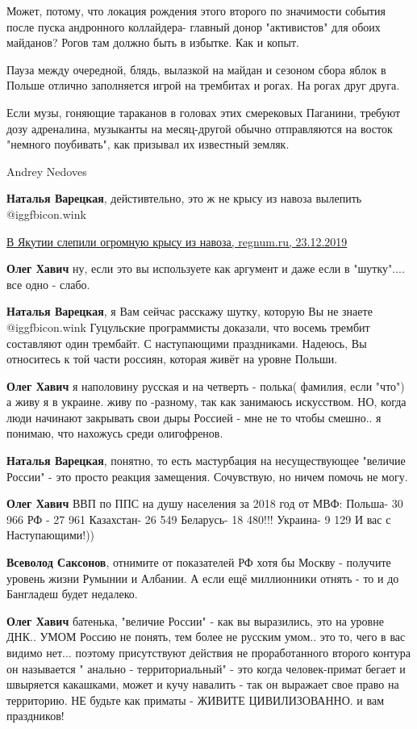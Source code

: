 \begin{itemize}
\begin{itemize}
Может, потому, что локация рождения этого второго по значимости события после
пуска андронного коллайдера- главный донор "активистов" для обоих майданов?
Рогов там должно быть в избытке. Как и копыт.

Пауза между очередной, блядь, вылазкой на майдан и сезоном сбора яблок в Польше
отлично заполняется игрой на трембитах и рогах. На рогах друг друга.

Если музы, гоняющие тараканов в головах этих смерековых Паганини, требуют дозу
адреналина, музыканты на месяц-другой обычно отправляются на восток "немного
поубивать", как призывал их известный земляк.

Andrey Nedoves

\textbf{Наталья Варецкая}, дейстивтельно, это ж не крысу из навоза вылепить  @igg{fbicon.wink} 

\href{https://regnum.ru/news/society/2814877.html}{%
В Якутии слепили огромную крысу из навоза, regnum.ru, 23.12.2019%
}

\textbf{Олег Хавич} ну, если это вы используете как аргумент и даже если в "шутку".... все одно - слабо.

\textbf{Наталья Варецкая}, я Вам сейчас расскажу шутку, которую Вы не знаете  @igg{fbicon.wink} 
Гуцульские программисты доказали, что восемь трембит составляют один трембайт.
С наступающими праздниками. Надеюсь, Вы относитесь к той части россиян, которая живёт на уровне Польши.

\textbf{Олег Хавич} я наполовину русская и на четверть - полька( фамилия, если "что") а живу я в украине. живу по -разному, так как занимаюсь искусством. НО, когда люди начинают закрывать свои дыры Россией - мне не то чтобы смешно.. я понимаю, что нахожусь среди олигофренов.

\textbf{Наталья Варецкая}, понятно, то есть мастурбация на несуществующее "величие России" - это просто реакция замещения. Сочувствую, но ничем помочь не могу.

\textbf{Олег Хавич}
ВВП по ППС на душу населения за 2018 год от МВФ:
Польша- 30 966
РФ - 27 961
Казахстан- 26 549
Беларусь- 18 480!!!
Украина- 9 129
И вас с Наступающими!))

\textbf{Всеволод Саксонов}, отнимите от показателей РФ хотя бы Москву - получите уровень жизни Румынии и Албании. А если ещё миллионники отнять - то и до Бангладеш будет недалеко.

\textbf{Олег Хавич} батенька, "величие России" - как вы выразились, это на уровне ДНК.. УМОМ Россию не понять, тем более не русским умом..
это то, чего в вас видимо нет... поэтому присутствуют действия не проработанного второго контура он называется " анально - территориальный" - это когда человек-примат бегает и швыряется какашками, может и кучу навалить - так он выражает свое право на территорию.
НЕ будьте как приматы - ЖИВИТЕ ЦИВИЛИЗОВАННО. и вам праздников!


\end{itemize}
\end{itemize}
